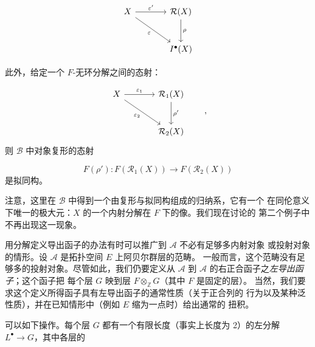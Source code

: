 \clearpage
{}

\[
\begin{tikzcd}[column sep=large,row sep=large]
X \arrow[r,"\varepsilon'"] \arrow[dr,"\varepsilon"']
  & \mathcal R(X) \arrow[d,"\rho"] \\
  & I^{\bullet}(X)
\end{tikzcd}
\]

此外，给定一个 $F$-无环分解之间的态射：

\[
\begin{tikzcd}[column sep=large,row sep=large]
X \arrow[r,"\varepsilon_1"] \arrow[dr,"\varepsilon_2"']
  & \mathcal R_1(X) \arrow[d,"\rho'"] \\
  & \mathcal R_2(X)
\end{tikzcd}
\qquad\text{,}
\]
则 $\mathcal B$ 中对象复形的态射

\[
F(\rho') : F(\mathcal R_1(X)) \longrightarrow F(\mathcal R_2(X))
\]
是拟同构。

注意，这里在 $\mathcal B$ 中得到一个由复形与拟同构组成的归纳系，它有一个
在同伦意义下唯一的极大元：$X$ 的一个内射分解在 $F$ 下的像。我们现在讨论的
第二个例子中不再出现这一现象。

用分解定义导出函子的办法有时可以推广到 $\mathcal A$ 不必有足够多内射对象
或投射对象的情形。设 $\mathcal A$ 是拓扑空间 $E$ 上阿贝尔群层的范畴。
一般而言，这个范畴没有足够多的投射对象。尽管如此，我们仍要定义从
$\mathcal A$ 到 $\mathcal A$ 的右正合函子之\emph{左导出函子}；这个函子把
每个层 $G$ 映到层 $F\otimes_{\mathbb Z}G$（其中 $F$ 是固定的层）。
当然，我们要求这个定义所得函子具有左导出函子的通常性质（关于正合列的
行为以及某种泛性质），并在已知情形中（例如 $E$ 缩为一点时）给出通常的
扭积。

可以如下操作。每个层 $G$ 都有一个有限长度（事实上长度为 2）的左分解
$L^{\bullet}\to G$，其中各层的
